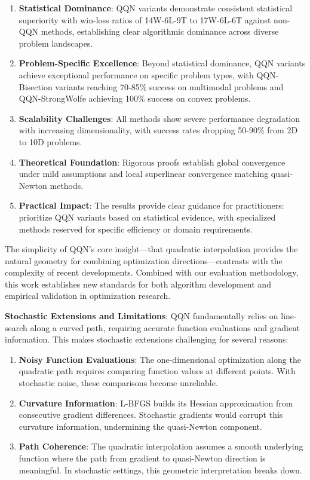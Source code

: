 \begin{enumerate}
\def\labelenumi{\arabic{enumi}.}
\item
  \textbf{Statistical Dominance}: QQN variants demonstrate consistent statistical superiority with win-loss ratios of 14W-6L-9T to 17W-6L-6T against non-QQN methods, establishing clear algorithmic dominance across diverse problem landscapes.
\item
  \textbf{Problem-Specific Excellence}: Beyond statistical dominance, QQN variants achieve exceptional performance on specific problem types, with QQN-Bisection variants reaching 70-85\% success on multimodal problems and QQN-StrongWolfe achieving 100\% success on convex problems.
\item
  \textbf{Scalability Challenges}: All methods show severe performance degradation with increasing dimensionality, with success rates dropping 50-90\% from 2D to 10D problems.
\item
  \textbf{Theoretical Foundation}: Rigorous proofs establish global convergence under mild assumptions and local superlinear convergence matching quasi-Newton methods.
\item
  \textbf{Practical Impact}: The results provide clear guidance for practitioners: prioritize QQN variants based on statistical evidence, with specialized methods reserved for specific efficiency or domain requirements.
\end{enumerate}

The simplicity of QQN's core insight---that quadratic interpolation provides the natural geometry for combining optimization directions---contrasts with the complexity of recent developments.
Combined with our evaluation methodology, this work establishes new standards for both algorithm development and empirical validation in optimization research.

\textbf{Stochastic Extensions and Limitations}: QQN fundamentally relies on line-search along a curved path, requiring accurate function evaluations and gradient information. This makes stochastic extensions challenging for several reasons:

\begin{enumerate}
\def\labelenumi{\arabic{enumi}.}
\item
  \textbf{Noisy Function Evaluations}: The one-dimensional optimization along the quadratic path requires comparing function values at different points.
  With stochastic noise, these comparisons become unreliable.
\item
  \textbf{Curvature Information}: L-BFGS builds its Hessian approximation from consecutive gradient differences.
  Stochastic gradients would corrupt this curvature information, undermining the quasi-Newton component.
\item
  \textbf{Path Coherence}: The quadratic interpolation assumes a smooth underlying function where the path from gradient to quasi-Newton direction is meaningful.
  In stochastic settings, this geometric interpretation breaks down.
\end{enumerate}

